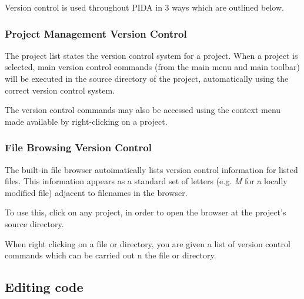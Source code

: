 \documentclass[10pt,a4paper,english]{article}
\begin{document}
Version control is used throughout PIDA in 3 ways which are outlined below.



\hypertarget{project-management-version-control}{}
\subsubsection*{Project Management Version Control}

The project list states the version control system for a project. When a
project is selected, main version control commands (from the main menu and
main toolbar) will be executed in the source directory of the project,
automatically using the correct version control system.

The version control commands may also be accessed using the context menu
made available by right-clicking on a project.



\hypertarget{file-browsing-version-control}{}
\subsubsection*{File Browsing Version Control}

The built-in file browser autoimatically lists version control information
for listed files. This information appears as a standard set of letters
(e.g. \emph{M} for a locally modified file) adjacent to filenames in the browser.

To use this, click on any project, in order to open the browser at the
project's source directory.

When right clicking on a file or directory, you are given a list of version
control commands which can be carried out n the file or directory.



\hypertarget{editing-code}{}
\subsection*{Editing code}
\end{document}
